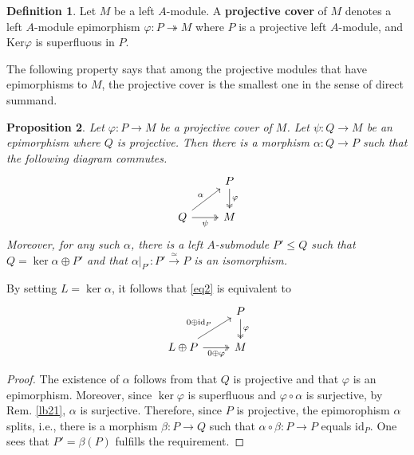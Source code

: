 \documentclass[11pt,b5paper,notitlepage]{article}
\theoremstyle{definition}
\newtheorem{df}{Definition}[section]
\theoremstyle{plain}
\newtheorem{pp}[df]{Proposition}
\newcommand{\id}{\mathrm{id}}
\newcommand{\Ker}{\mathrm{Ker}}
\numberwithin{equation}{section}
\begin{document}
\begin{df}
Let $M$ be a left $A$-module. A \textbf{projective cover} of $M$ denotes a left $A$-module epimorphism $\varphi:P\twoheadrightarrow M$ where $P$ is a projective left $A$-module, and $\Ker\varphi$ is superfluous in $P$.
\end{df}


The following property says that among the projective modules that have epimorphisms to $M$, the projective cover is the smallest one in the sense of direct summand.


\begin{pp}\label{lb23}
Let $\varphi:P\rightarrow M$ be a projective cover of $M$. Let $\psi:Q\rightarrow M$ be an epimorphism where $Q$ is projective. Then there is a morphism $\alpha:Q\rightarrow P$ such that the following diagram commutes. 
\begin{equation}\label{eq2}
\begin{tikzcd}
                       & P \arrow[d,"\varphi", two heads] \\
Q \arrow[ru,"\alpha"] \arrow[r,"\psi"', two heads] & M          
\end{tikzcd}
\end{equation}
Moreover, for any such $\alpha$, there is a left $A$-submodule $P'\leq Q$ such that $Q=\ker\alpha\oplus P'$ and that $\alpha|_{P'}:P'\xrightarrow{\simeq} P$ is an isomorphism.
\end{pp}

By setting $L=\ker\alpha$, it follows that \eqref{eq2} is equivalent to
\begin{equation}\label{eq3}
\begin{tikzcd}
                       & P \arrow[d,"\varphi", two heads] \\
L\oplus P \arrow[ru,"0\oplus \id_P"] \arrow[r,"0\oplus\varphi"', two heads] & M          
\end{tikzcd}
\end{equation}


\begin{proof}
The existence of $\alpha$ follows from that $Q$ is projective and that $\varphi$ is an epimorphism. Moreover, since $\ker\varphi$ is superfluous and $\varphi\circ\alpha$ is surjective, by Rem. \ref{lb21}, $\alpha$ is surjective. Therefore, since $P$ is projective, the epimorophism $\alpha$ splits, i.e., there is a morphism $\beta:P\rightarrow Q$ such that $\alpha\circ\beta:P\rightarrow P$ equals $\id_P$. One sees that $P'=\beta(P)$ fulfills the requirement.
\end{proof}
\end{document}
